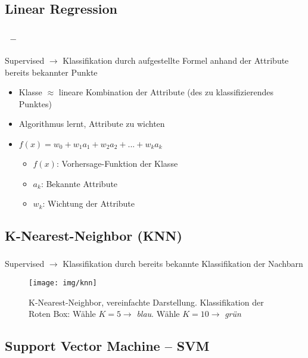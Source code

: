 \subsection{Linear Regression}

\begin{frame}
    \frametitle{\insertsubsection \ -- \cite{datamining2011}}
    Supervised $\rightarrow$ Klassifikation durch aufgestellte Formel anhand der Attribute bereits bekannter Punkte
    \vspace{1em}
    \begin{itemize}
        \setlength\itemsep{0.8em}
        \item Klasse $\approx$ lineare Kombination der Attribute (des zu klassifizierendes Punktes)
        \item Algorithmus lernt, Attribute zu wichten
        \item $f(x) = w_0 + w_1a_1 + w_2a_2 + ... + w_ka_k$
        \begin{itemize}
            \vspace{0.6em}
            \setlength\itemsep{0.6em}
            \item $f(x)$: Vorhersage-Funktion der Klasse
            \item $a_k$: Bekannte Attribute
            \item $w_k$: Wichtung der Attribute
        \end{itemize}
    \end{itemize}
\end{frame}

\subsection{K-Nearest-Neighbor (KNN)}

\begin{frame}
    \frametitle{\insertsubsection}
    Supervised $\rightarrow$ Klassifikation durch bereits bekannte Klassifikation der Nachbarn \cite{datamining2011}
    \begin{figure}[H]
        \centering
        \texttt{[image: img/knn]}
        \caption{K-Nearest-Neighbor, vereinfachte Darstellung. Klassifikation der Roten Box: Wähle $K=5 \rightarrow$ \textit{blau}. Wähle $K=10 \rightarrow$ \textit{grün}\label{fig:knn}}
    \end{figure}
\end{frame}


\subsection{Support Vector Machine -- SVM}

